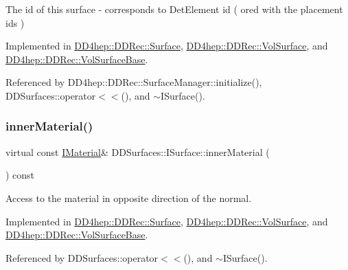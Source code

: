 The id of this surface -\/ corresponds to Det\+Element id ( or\textquotesingle{}ed with the placement ids ) 



Implemented in \hyperlink{class_d_d4hep_1_1_d_d_rec_1_1_surface_a5287eb53d729f58db5c14b6db98b1db7}{D\+D4hep\+::\+D\+D\+Rec\+::\+Surface}, \hyperlink{class_d_d4hep_1_1_d_d_rec_1_1_vol_surface_a4aca7e181f70ca7319025692b8afd6a6}{D\+D4hep\+::\+D\+D\+Rec\+::\+Vol\+Surface}, and \hyperlink{class_d_d4hep_1_1_d_d_rec_1_1_vol_surface_base_a7b86431da7ec970cde28adfeade28427}{D\+D4hep\+::\+D\+D\+Rec\+::\+Vol\+Surface\+Base}.



Referenced by D\+D4hep\+::\+D\+D\+Rec\+::\+Surface\+Manager\+::initialize(), D\+D\+Surfaces\+::operator$<$$<$(), and $\sim$\+I\+Surface().

\hypertarget{class_d_d_surfaces_1_1_i_surface_a18942d2f0ea7478506765a50fa44d5e3}{}\label{class_d_d_surfaces_1_1_i_surface_a18942d2f0ea7478506765a50fa44d5e3} 
\subsubsection{\texorpdfstring{inner\+Material()}{innerMaterial()}}
{\footnotesize\ttfamily virtual const \hyperlink{class_d_d_surfaces_1_1_i_material}{I\+Material}\& D\+D\+Surfaces\+::\+I\+Surface\+::inner\+Material (\begin{DoxyParamCaption}{ }\end{DoxyParamCaption}) const\hspace{0.3cm}{\ttfamily [pure virtual]}}



Access to the material in opposite direction of the normal. 



Implemented in \hyperlink{class_d_d4hep_1_1_d_d_rec_1_1_surface_a8e0b69cde006a054df7c33d8a781093b}{D\+D4hep\+::\+D\+D\+Rec\+::\+Surface}, \hyperlink{class_d_d4hep_1_1_d_d_rec_1_1_vol_surface_a102814166f4ba579d3587ed0b5284aa4}{D\+D4hep\+::\+D\+D\+Rec\+::\+Vol\+Surface}, and \hyperlink{class_d_d4hep_1_1_d_d_rec_1_1_vol_surface_base_ab963afedcbd258aa996223abe1e065bb}{D\+D4hep\+::\+D\+D\+Rec\+::\+Vol\+Surface\+Base}.



Referenced by D\+D\+Surfaces\+::operator$<$$<$(), and $\sim$\+I\+Surface().

